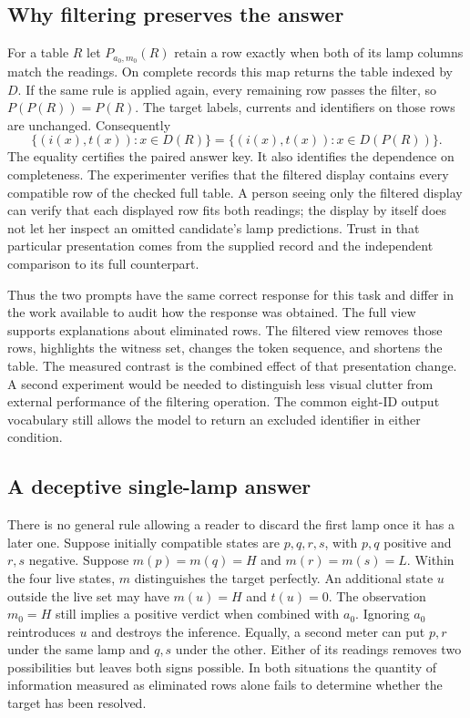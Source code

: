 \documentclass[12pt,letterpaper]{article}
\begin{document}
\subsection{Why filtering preserves the answer}

For a table $R$ let $P_{a_0,m_0}(R)$ retain a row exactly when both of its lamp columns match the readings. On complete records this map returns the table indexed by $D$. If the same rule is applied again, every remaining row passes the filter, so $P(P(R))=P(R)$. The target labels, currents and identifiers on those rows are unchanged. Consequently
\[
 \{(i(x),t(x)):x\in D(R)\}
 =
 \{(i(x),t(x)):x\in D(P(R))\}.
\]
The equality certifies the paired answer key. It also identifies the dependence on completeness. The experimenter verifies that the filtered display contains every compatible row of the checked full table. A person seeing only the filtered display can verify that each displayed row fits both readings; the display by itself does not let her inspect an omitted candidate's lamp predictions. Trust in that particular presentation comes from the supplied record and the independent comparison to its full counterpart.

Thus the two prompts have the same correct response for this task and differ in the work available to audit how the response was obtained. The full view supports explanations about eliminated rows. The filtered view removes those rows, highlights the witness set, changes the token sequence, and shortens the table. The measured contrast is the combined effect of that presentation change. A second experiment would be needed to distinguish less visual clutter from external performance of the filtering operation. The common eight-ID output vocabulary still allows the model to return an excluded identifier in either condition.

\subsection{A deceptive single-lamp answer}

There is no general rule allowing a reader to discard the first lamp once it has a later one. Suppose initially compatible states are $p,q,r,s$, with $p,q$ positive and $r,s$ negative. Suppose $m(p)=m(q)=H$ and $m(r)=m(s)=L$. Within the four live states, $m$ distinguishes the target perfectly. An additional state $u$ outside the live set may have $m(u)=H$ and $t(u)=0$. The observation $m_0=H$ still implies a positive verdict when combined with $a_0$. Ignoring $a_0$ reintroduces $u$ and destroys the inference. Equally, a second meter can put $p,r$ under the same lamp and $q,s$ under the other. Either of its readings removes two possibilities but leaves both signs possible. In both situations the quantity of information measured as eliminated rows alone fails to determine whether the target has been resolved.
\end{document}
